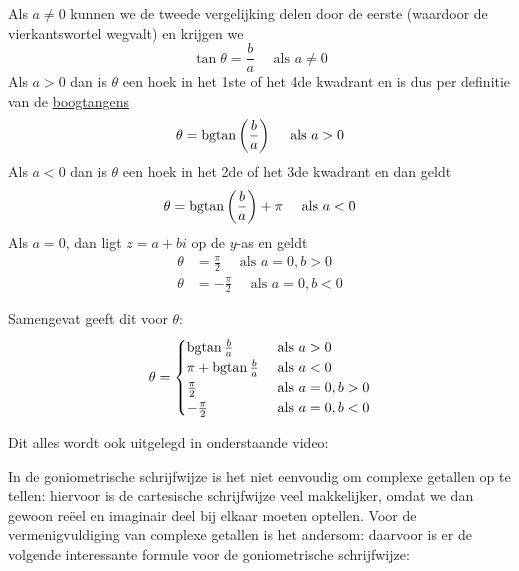 \documentclass{ximera}
\begin{document}
 
 
 

 
 
\begin{remark}\nl
     
    Als $a \neq 0$ kunnen we de tweede vergelijking delen door de eerste (waardoor de vierkantswortel wegvalt) en krijgen we
    $$
    \tan \theta = \frac{b}{a}  \quad \text{ als } a \neq 0
    $$
    Als $a >0$ dan is $\theta$ een hoek in het 1ste of het 4de kwadrant en is dus per definitie van de \hyperref[xim:cyclometrische_functies]{boogtangens }
    $$
    \theta  =  \operatorname{bgtan} \left(\frac{b}{a}\right) \quad \text{ als }  a>0
    $$
    Als $a<0$ dan is $\theta$ een hoek in het 2de of het 3de kwadrant en dan geldt
    $$
    \theta  =  \operatorname{bgtan} \left(\frac{b}{a}\right) + \pi \quad \text{ als }  a<0
    $$
    Als $a=0$, dan ligt $z=a+bi$ op de $y$-as en geldt
    \begin{align*}
    \theta & =  \frac{\pi}{2}  \quad\text{ als } a=0, b > 0\\
    \theta & = -\frac{\pi}{2} \quad\text{ als } a=0, b < 0
    \end{align*}
     
    Samengevat geeft dit voor $\theta$:
    $$
    \theta = \begin{cases}
    \bgtan \frac{b}{a}       & \text{ als } a>0        \\
    \pi + \bgtan \frac{b}{a} & \text{ als } a<0        \\   %
    \frac{\pi}{2}            & \text{ als } a=0, b > 0 \\
    -\frac{\pi}{2}           & \text{ als } a=0, b < 0
    \end{cases}
    $$
    \begin{basicSkip}
Dit alles wordt ook uitgelegd in onderstaande video:
 
\end{basicSkip}
 
\end{remark}
 
 
 
\nl
 
In de goniometrische schrijfwijze is het niet eenvoudig om complexe getallen op te tellen: hiervoor is de cartesische schrijfwijze veel makkelijker, omdat we dan gewoon reëel en imaginair deel bij elkaar moeten optellen. Voor de vermenigvuldiging van complexe getallen is het andersom: daarvoor is er de volgende interessante formule voor de goniometrische schrijfwijze:
 
\end{document}
